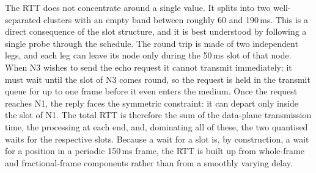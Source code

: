 The RTT does not concentrate around a single value. It splits into two
well-separated clusters with an empty band between roughly 60 and 190\,ms.
This is a direct consequence of the slot structure, and it is best understood
by following a single probe through the schedule. The round trip is made of
two independent legs, and each leg can leave its node only during the 50\,ms
slot of that node. When N3 wishes to send the echo request it cannot transmit
immediately: it must wait until the slot of N3 comes round, so the request is held
in the transmit queue for up to one frame before it even enters the medium.
Once the request reaches N1, the reply faces the symmetric constraint: it
can depart only inside the slot of N1. The total RTT is therefore the sum of the
data-plane transmission time, the processing at each end, and, dominating all
of these, the two quantised waits for the respective slots. Because a wait for
a slot is, by construction, a wait for a position in a periodic 150\,ms frame,
the RTT is built up from whole-frame and fractional-frame components rather
than from a smoothly varying delay.

